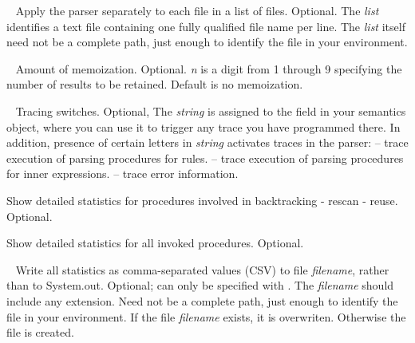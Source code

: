 \item[\tx{-F} \textit{list}]\ \newline
    Apply the parser separately to each file in a list of files. Optional.\newline
    The \textit{list} identifies a text file containing one fully qualified file name per line.
    The \textit{list} itself need not be a complete path, just enough to identify the file
    in your environment.

\item[\tx{-m} \textit{n}]\ \newline
    Amount of memoization. Optional.\newline 
    \textit{n} is a digit from 1 through 9 specifying the number of results to be retained.
    Default is no memoization.

\item[\tx{-T} \textit{string}]\ \newline
    Tracing switches. Optional,\newline
    The \textit{string} is assigned to the  field in your semantics object,
    where you can use it to trigger any trace you have programmed there.
    In addition, presence of certain letters in \textit{string}
    activates traces in the parser:\newline
     -- trace execution of parsing procedures for rules.\newline
     -- trace execution of parsing procedures for inner expressions.\newline
     -- trace error information.
        
\item[\tx{-d}]
    Show detailed statistics for procedures involved in backtracking - rescan - reuse. Optional.
        
\item[\tx{-D}]
    Show detailed statistics for all invoked procedures. Optional.
    
\item[\tx{-C} \textit{filename}]\ \newline
    Write all statistics as comma-separated values (CSV) to file \textit{filename},
    rather than to System.out.\newline
    Optional; can only be specified with .\newline
    The \textit{filename} should include any extension.\newline
    Need not be a complete path, just enough to identify the file
    in your environment.\newline
    If the file \textit{filename} exists, it is overwriten.
    Otherwise the file is created.

